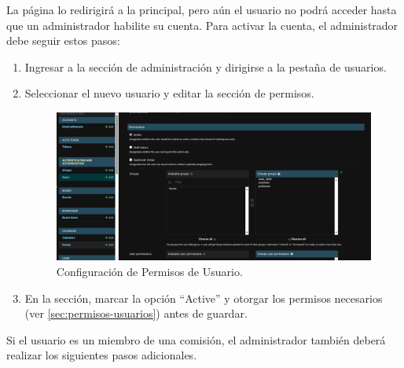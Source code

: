 La página lo redirigirá a la principal, pero aún el usuario no podrá acceder hasta que un administrador habilite su cuenta. Para activar la cuenta, el administrador debe seguir estos pasos:

\begin{enumerate}
    \item Ingresar a la sección de administración y dirigirse a la pestaña de usuarios.
    \item Seleccionar el nuevo usuario y editar la sección de permisos.


    \begin{figure}[H]
        \centering
        \includegraphics[width=1\linewidth]{fig/user-permission.png}
        \caption{Configuración de Permisos de Usuario.}
        \label{fig:user-permission}
    \end{figure}
    
    \item En la sección, marcar la opción ``Active'' y otorgar los permisos necesarios (ver \ref{sec:permisos-usuarios}) antes de guardar.

\end{enumerate}

Si el usuario es un miembro de una comisión, el administrador también deberá realizar los siguientes pasos adicionales.

